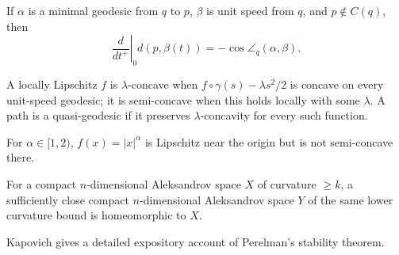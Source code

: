 \begin{lemma}
\label{lem:chow-iii-g53-distance-derivative}
If $\alpha$ is a minimal geodesic from $q$ to $p$, $\beta$ is unit speed from
$q$, and $p\notin C(q)$, then
\[
\left.\frac{d}{dt^+}\right|_{0}d(p,\beta(t))=-\cos\angle_q(\alpha,\beta).
\]
\end{lemma}

\begin{definition}
\label{def:chow-iii-g54-g56-semi-concavity}
A locally Lipschitz $f$ is $\lambda$-concave when
$f\circ\gamma(s)-\lambda s^2/2$ is concave on every unit-speed geodesic; it is
semi-concave when this holds locally with some $\lambda$.  A path is a
quasi-geodesic if it preserves $\lambda$-concavity for every such function.
\end{definition}

\begin{example}
\label{ex:chow-iii-g55-power-function}
For $\alpha\in[1,2)$, $f(x)=|x|^\alpha$ is Lipschitz near the origin but is
not semi-concave there.
\end{example}

\begin{theorem}
\label{thm:chow-iii-g57-stability}
For a compact $n$-dimensional Aleksandrov space $X$ of curvature $\geq k$, a
sufficiently close compact $n$-dimensional Aleksandrov space $Y$ of the same
lower curvature bound is homeomorphic to $X$.
\end{theorem}

\begin{remark}
\label{rem:chow-iii-g58-stability-reference}
Kapovich gives a detailed expository account of Perelman's stability theorem.
\end{remark}

